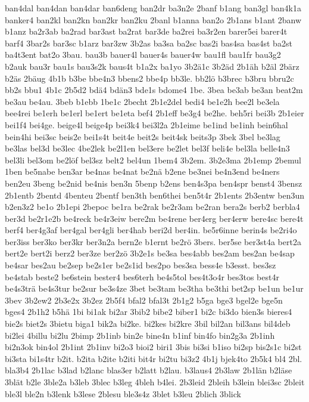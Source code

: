 {ban4dal
ban4dan
ban4dar
ban6deng
ban2dr
ba3n2e
2banf
b1ang
ban3gl
ban4k1a
banker4
ban2kl
ban2kn
ban2kr
ban2ku
2banl
b1anna
ban2o
2b1ans
b1ant
2banw
b1anz
ba2r3ab
ba2rad
bar3ast
ba2rat
bar3de
ba2rei
ba3r2en
barer5ei
barer4t
barf4
3bar2s
bar3sc
b1arz
bar3zw
3b2as
ba3sa
ba2sc
bas2i
bas4sa
bas4st
ba2st
ba4t3ent
bat2o
3bau.
bau3b
bauer4l
bauer4s
bauer4w
bau1fl
bau1fr
bau3g2
b2auk
bau3r
bau1s
bau3s2k
baus4t
b1a2x
ba1yo
3b2ä1c
3b2äd
2b1äh
b2äl
2bärz
b2äs
2bäug
4b1b
b3be
bbe4n3
bbens2
bbe4p
bb3le.
bb2lö
b3brec
b3bru
bbru2c
bb2s
bbu1
4b1c
2b5d2
bdä4
bdän3
bde1s
bdome4
1be.
3bea
be3ab
be3an
beat2m
be3au
be4au.
3beb
b1ebb
1be1c
2becht
2b1e2del
bedi4
be1e2h
bee2l
be3ela
bee4rei
be1erh
be1erl
be1ert
be1eta
bef4
2b1eff
be3g4
be2he.
beh5ri
bei3b
2b1eier
bei1f4
bei4ge.
beige4l
beige4p
bei3k4
bei3l2a
2b1eime
be1ind
be1inh
bein6hal
bein4hi
bei3sc
beis2e
bei1s4t
beit4e
beit2s
beit4sk
beits3p
3bek
3bel
be3lag
be3las
bel3d
be3lec
4be2lek
be2l1en
bel3ere
be2let
bel3f
beli4e
bel3la
belle4n3
bel3li
bel3om
be2löf
bel3sz
belt2
bel4un
1bem4
3b2em.
3b2e3ma
2b1emp
2bemul
1ben
be5nabe
ben3ar
be4nas
be4nat
be2nä
b2ene
be3nei
be4n3end
be4ners
ben2eu
3beng
be2nid
be4nis
ben3n
5benp
b2ens
ben4s3pa
ben4spr
benst4
3bensz
2b1entb
2bentd
4benteu
2bentf
ben3th
ben6thei
ben5t4r
2b1ents
2b3entw
ben3un
b2en3z2
be1o
2b1epi
2bepoc
be1ra
be2rak
be2r3am
be2ran
bera2s
berb2
berbla4
ber3d
be2r1e2b
be4reck
be4r3eiw
bere2m
be4rene
ber4erg
ber4erw
bere4sc
bere4t
berf4
ber4g3af
ber4gal
ber4gli
ber4hab
beri2d
ber4in.
be5r6inne
berin4s
be2ri4o
ber3iss
ber3ko
ber3kr
ber3n2a
bern2e
b1ernt
be2rö
3bers.
ber5se
ber3st4a
bert2a
bert2e
bert2i
berz2
ber3ze
ber2zö
3b2e1s
be3sa
bes4abb
bes2am
bes2an
be4sap
be4sar
bes2au
be2sep
be2s1er
be2s1id
bes2po
bes3sa
bess4e
b3esst.
bes3sz
be4stab
beste2
be6stein
bester4
bes6terh
be4s5tol
bes4t3o4r
bes3tos
best4r
be4s3trä
be4s3tur
be2sur
be3s4ze
3bet
be3tam
be3tha
be3thi
bet2sp
be1un
be1ur
3bev
3b2ew2
2b3e2x
3b2ez
2b5f4
bfal2
bfal3t
2b1g2
b5ga
bge3
bgel2e
bge5n
bges4
2b1h2
b5hä
1bi
bi1ak
bi2ar
3bib2
bibe2
biber1
bi2c
bi3do
bien3s
bieres4
bie2s
biet2s
3bietu
biga1
bik2a
bi2ke.
bi2kes
bi2kre
3bil
bil2an
bil3ans
bil4deb
bi2lei
4billu
bi2lu
2bimp
2b1inb
bin2e
bine4n
b1inf
bin4fo
bin2g3a
2b1inh
bi2n3ok
bin4ol
2b1int
2b1inv
bi2o3
bioi2
biri1
3bis
bi3si
b1iso
bi2sp
bis2s1c
bi2st
bi3sta
bi1s4tr
b2it.
b2ita
b2ite
b2iti
bit4r
bi2tu
bi3z2
4b1j
bjek4to
2b5k4
bl4
2bl.
bla3b4
2b1lac
b3lad
b2lanc
blas3er
b2latt
b2lau.
b3laus4
2b3law
2b1län
b2läse
3blät
b2le
3ble2a
b3leb
3blec
b3leg
4bleh
b4lei.
2b3leid
2bleih
b3lein
blei3sc
2bleit
ble3l
ble2n
b3lenk
b3lese
2blesu
ble3s4z
3blet
b3leu
2blich
3blick
}
